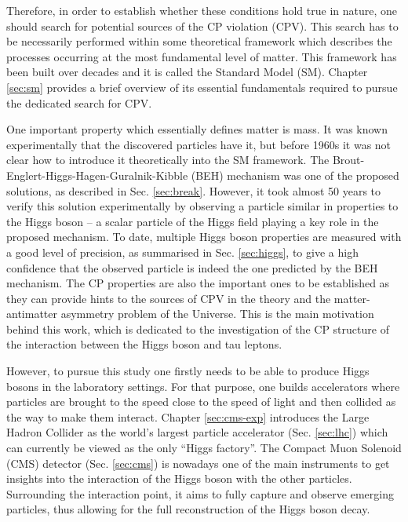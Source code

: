 Therefore, in order to establish whether these conditions hold true in nature, one should search for potential sources of the CP violation (CPV). This search has to be necessarily performed within some theoretical framework which describes the processes occurring at the most fundamental level of matter. This framework has been built over decades and it is called the Standard Model (SM). Chapter \ref{sec:sm} provides a brief overview of its essential fundamentals required to pursue the dedicated search for CPV. 

One important property which essentially defines matter is mass. It was known experimentally that the discovered particles have it, but before 1960s it was not clear how to introduce it theoretically into the SM framework. The Brout-Englert-Higgs-Hagen-Guralnik-Kibble (BEH) mechanism was one of the proposed solutions, as described in Sec. \ref{sec:break}. However, it took almost 50 years to verify this solution experimentally by observing a particle similar in properties to the Higgs boson -- a scalar particle of the Higgs field playing a key role in the proposed mechanism. To date, multiple Higgs boson properties are measured with a good level of precision, as summarised in Sec. \ref{sec:higgs}, to give a high confidence that the observed particle is indeed the one predicted by the BEH mechanism. The CP properties are also the important ones to be established as they can provide hints to the sources of CPV in the theory and the matter-antimatter asymmetry problem of the Universe. This is the main motivation behind this work, which is dedicated to the investigation of the CP structure of the interaction between the Higgs boson and tau leptons.  

However, to pursue this study one firstly needs to be able to produce Higgs bosons in the laboratory settings. For that purpose, one builds accelerators where particles are brought to the speed close to the speed of light and then collided as the way to make them interact. Chapter \ref{sec:cms-exp} introduces the Large Hadron Collider as the world’s largest particle accelerator (Sec. \ref{sec:lhc}) which can currently be viewed as the only \enquote{Higgs factory}. The Compact Muon Solenoid (CMS) detector (Sec. \ref{sec:cms}) is nowadays one of the main instruments to get insights into the interaction of the Higgs boson with the other particles. Surrounding the interaction point, it aims to fully capture and observe emerging particles, thus allowing for the full reconstruction of the Higgs boson decay.

